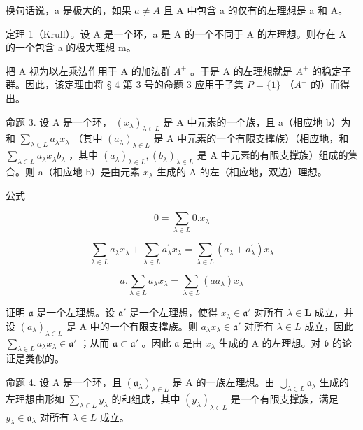 换句话说，a 是极大的，如果 \(a \neq A\) 且 A 中包含 a 的仅有的左理想是 a 和 A。

定理 1（Krull）。设 A 是一个环，a 是 A 的一个不同于 A 的左理想。则存在 A 的一个包含 a 的极大理想 m。

把 A 视为以左乘法作用于 A 的加法群 \(A^{+}\) 。于是 A 的左理想就是 \(A^{+}\) 的稳定子群。因此，该定理由将 § 4 第 3 号的命题 3 应用于子集 \(P = \{1\}\) （\(A^{+}\) 的）而得出。

命题 3. 设 A 是一个环， \((x_{\lambda})_{\lambda \in L}\) 是 A 中元素的一个族，且 a（相应地 b）为和 \(\sum_{\lambda \in L} a_{\lambda} x_{\lambda}\) （其中 \((a_{\lambda})_{\lambda \in L}\) 是 A 中元素的一个有限支撑族）（相应地，和 \(\sum_{\lambda \in L} a_{\lambda} x_{\lambda} b_{\lambda}\) ，其中 \((a_{\lambda})_{\lambda \in L}, (b_{\lambda})_{\lambda \in L}\) 是 A 中元素的有限支撑族）组成的集合。则 a（相应地 b）是由元素 \(x_{\lambda}\) 生成的 A 的左（相应地，双边）理想。

公式

\[
0 = \sum_ {\lambda \in L} 0. x _ {\lambda}\tag{18}
\]

\[
\sum_ {\lambda \in L} a _ {\lambda} x _ {\lambda} + \sum_ {\lambda \in L} a _ {\lambda} ^ {\prime} x _ {\lambda} = \sum_ {\lambda \in L} (a _ {\lambda} + a _ {\lambda} ^ {\prime}) x _ {\lambda}\tag{19}
\]

\[
a. \sum_ {\lambda \in L} a _ {\lambda} x _ {\lambda} = \sum_ {\lambda \in L} (a a _ {\lambda}) x _ {\lambda}\tag{20}
\]

证明 \(\mathfrak{a}\) 是一个左理想。设 \(\mathfrak{a}'\) 是一个左理想，使得 \(x_{\lambda} \in \mathfrak{a}'\) 对所有 \(\lambda \in \mathbf{L}\) 成立，并设 \((a_{\lambda})_{\lambda \in L}\) 是 A 中的一个有限支撑族。则 \(a_{\lambda}x_{\lambda}\in \mathfrak{a}'\) 对所有 \(\lambda \in L\) 成立，因此 \(\sum_{\lambda \in L}a_{\lambda}x_{\lambda}\in \mathfrak{a}'\) ；从而 \(\mathfrak{a}\subset \mathfrak{a}'\) 。因此 \(\mathfrak{a}\) 是由 \(x_{\lambda}\) 生成的 A 的左理想。对 \(\mathfrak{b}\) 的论证是类似的。

命题 4. 设 A 是一个环，且 \((\mathfrak{a}_{\lambda})_{\lambda \in L}\) 是 A 的一族左理想。由 \(\bigcup_{\lambda \in L} \mathfrak{a}_{\lambda}\) 生成的左理想由形如 \(\sum_{\lambda \in L} y_{\lambda}\) 的和组成，其中 \((y_{\lambda})_{\lambda \in L}\) 是一个有限支撑族，满足 \(y_{\lambda} \in \mathfrak{a}_{\lambda}\) 对所有 \(\lambda \in L\) 成立。


